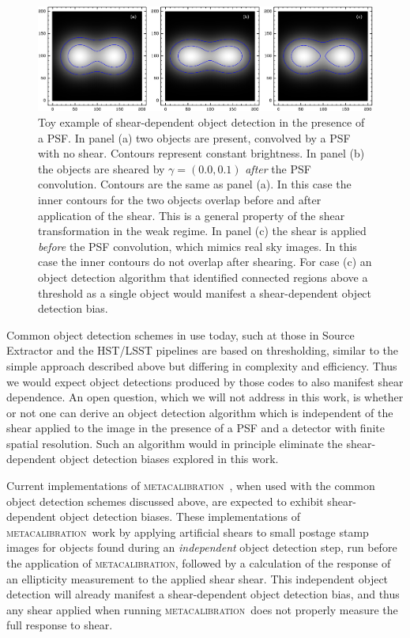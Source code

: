 \documentclass[fleqn,useAMS,usenatbib]{mnras}
\newcommand{\mcal}{\textsc{metacalibration}}
\begin{document}
\begin{figure}
  \includegraphics[width=\textwidth]{figures/toy.png}

  \caption{ Toy example of shear-dependent object detection in the presence of a
  PSF.  In panel (a) two objects are present, convolved by a PSF with no
  shear.  Contours represent constant brightness.  In panel (b) the objects
  are sheared by $\gamma = (0.0, 0.1)$ {\em after} the PSF convolution.
  Contours are the same as panel (a).  In this case the inner contours for
  the two objects overlap before and after application of the shear.  This is
  a general property of the shear transformation in the weak regime. In panel
  (c) the shear is applied {\em before} the PSF convolution, which mimics real
  sky images. In this case the inner contours do not overlap after shearing.
  For case (c) an object detection algorithm that identified connected regions above
  a threshold as a single object would manifest a shear-dependent object detection
  bias.  \label{fig:toy} }

\end{figure}

Common object detection schemes in use today, such at those in Source Extractor
\citep{Bertin96} and the HST/LSST pipelines \citep{BoschHSC2018,BoschLSST2018}
are based on thresholding, similar to the simple approach described above but
differing in complexity and efficiency. Thus we would expect object detections
produced by those codes to also manifest shear dependence. An open question,
which we will not address in this work, is whether or not one can derive an
object detection algorithm which is independent of the shear applied to the
image in the presence of a PSF and a detector with finite spatial resolution.
Such an algorithm would in principle eliminate the shear-dependent object
detection biases explored in this work.

Current implementations of \mcal\
\citep[e.g.,][]{HuffMcal2017,SheldonMcal2017}, when used with the common object
detection schemes discussed above, are expected to exhibit shear-dependent
object detection biases. These implementations of \mcal\ work by applying
artificial shears to small postage stamp images for objects found during an
{\em independent} object detection step, run before the application of \mcal,
followed by a calculation of the response of an ellipticity measurement to the
applied shear shear. This independent object detection will already manifest a
shear-dependent object detection bias, and thus any shear applied when running
\mcal\ does not properly measure the full response to shear.
\end{document}
